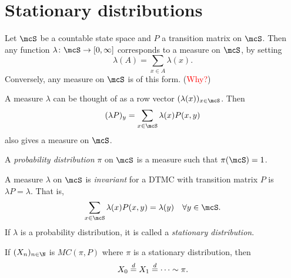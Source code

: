 \section{Stationary distributions} \label{sec:inv}
Let $\mcS$ be a countable state space and $P$ a transition matrix on $\mcS$.
Then any function $\lambda\colon \mcS \to [0, \infty]$ corresponds to a
measure on $\mcS$, by setting \[
    \lambda(A) = \sum_{x \in A} \lambda(x).
\] Conversely, any measure on $\mcS$ is of this form.
(\textcolor{Red}{Why?}) %

A measure $\lambda$ can be thought of as a row vector
$(\lambda(x))_{x \in \mcS}$.
Then \[
    (\lambda P)_y = \sum_{x \in \mcS} \lambda(x) P(x, y)
\] also gives a measure on $\mcS$.

A \emph{probability distribution} $\pi$ on $\mcS$ is a measure such that
$\pi(\mcS) = 1$.

\begin{definition*} \label{def:inv:measure}
    A measure $\lambda$ on $\mcS$ is \emph{invariant} for a DTMC with
    transition matrix $P$ is $\lambda P = \lambda$.
    That is, \[
        \sum_{x \in \mcS} \lambda(x) P(x, y) = \lambda(y)
            \quad \forall y \in \mcS.
    \]
    If $\lambda$ is a probability distribution, it is called a
    \emph{stationary distribution}.
\end{definition*}

\begin{proposition}
    If $(X_n)_{n \in \N}$ is $MC(\pi, P)$ where $\pi$ is a stationary
    distribution, then \[
        X_0 \overset{d}{=} X_1 \overset{d}{=} \dots \sim \pi.
    \]
\end{proposition}
